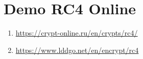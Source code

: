 \documentclass{article}
\begin{document}

\section*{Demo RC4 Online}

\begin{enumerate}
  \item \url{https://crypt-online.ru/en/crypts/rc4/}
  \item \url{https://www.lddgo.net/en/encrypt/rc4}
\end{enumerate}
\end{document}
